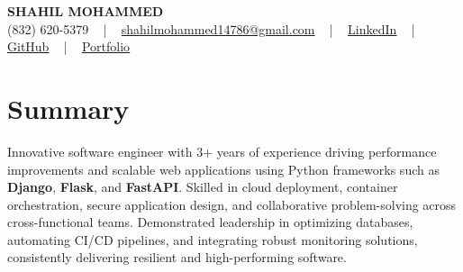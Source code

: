 \documentclass[letterpaper,10pt]{article}
\begin{document}
\begin{center}
    {\fontsize{14pt}{12pt}\selectfont \textbf{\MakeUppercase{Shahil Mohammed}}}\\ \vspace{2pt}
    \fontsize{10pt}{12pt}\selectfont (832) 620-5379 ~ | ~ \href{mailto:shahilmohammed14786@gmail.com}{shahilmohammed14786@gmail.com} ~ | ~  
    \href{https://www.linkedin.com/in/shahil-mohammed-9652931a1/}{\color{blue}\underline{LinkedIn}}  ~ | ~ 
    \href{https://github.com/freakbeast14}{\color{blue}\underline{GitHub}} ~ | ~ 
    \href{https://shahil-mohammed.netlify.app/}{\color{blue}\underline{Portfolio}}
    \vspace{-8pt}
\end{center}

\section{Summary}
\vspace{-2pt}\fontsize{8pt}{9pt}\selectfont
Innovative software engineer with 3+ years of experience driving performance improvements and scalable web applications using Python frameworks such as \textbf{Django}, \textbf{Flask}, and \textbf{FastAPI}. Skilled in cloud deployment, container orchestration, secure application design, and collaborative problem-solving across cross-functional teams. Demonstrated leadership in optimizing databases, automating CI/CD pipelines, and integrating robust monitoring solutions, consistently delivering resilient and high-performing software.
 \vspace{-5pt}
 
\vspace{-2pt}
\end{document}
